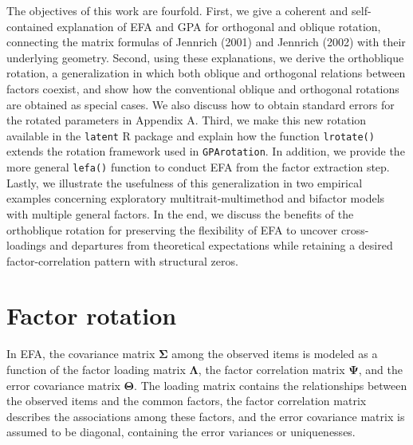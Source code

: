 \documentclass[
  12pt,
  letterpaper,
  article]{scrartcl}
\begin{document}
The objectives of this work are fourfold. First, we give a coherent and
self-contained explanation of EFA and GPA for orthogonal and oblique
rotation, connecting the matrix formulas of Jennrich (2001) and Jennrich
(2002) with their underlying geometry. Second, using these explanations,
we derive the orthoblique rotation, a generalization in which both
oblique and orthogonal relations between factors coexist, and show how
the conventional oblique and orthogonal rotations are obtained as
special cases. We also discuss how to obtain standard errors for the
rotated parameters in Appendix A. Third, we make this new rotation
available in the \texttt{latent} R package and explain how the function
\texttt{lrotate()} extends the rotation framework used in
\texttt{GPArotation}. In addition, we provide the more general
\texttt{lefa()} function to conduct EFA from the factor extraction step.
Lastly, we illustrate the usefulness of this generalization in two
empirical examples concerning exploratory multitrait-multimethod and
bifactor models with multiple general factors. In the end, we discuss
the benefits of the orthoblique rotation for preserving the flexibility
of EFA to uncover cross-loadings and departures from theoretical
expectations while retaining a desired factor-correlation pattern with
structural zeros.

\section{Factor rotation}\label{factor-rotation}

In EFA, the covariance matrix \(\mathbf{\Sigma}\) among the observed
items is modeled as a function of the factor loading matrix
\(\mathbf{\Lambda}\), the factor correlation matrix \(\mathbf{\Psi}\),
and the error covariance matrix \(\mathbf{\Theta}\). The loading matrix
contains the relationships between the observed items and the common
factors, the factor correlation matrix describes the associations among
these factors, and the error covariance matrix is assumed to be
diagonal, containing the error variances or uniquenesses.
\end{document}
